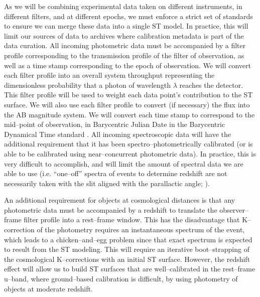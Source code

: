 As we will be combining experimental data taken on different instruments, in
different filters, and at different epochs, we must enforce a strict set of
standards to ensure we can merge these data into a single ST model. In practice,
this will limit our sources of data to archives where calibration metadata is
part of the data curation. All incoming photometric data must be accompanied by
a filter profile corresponding to the transmission profile of the filter of
observation, as well as a time stamp corresponding to the epoch of observation.
We will convert each filter profile into an overall system throughput
representing the dimensionless probability that a photon of wavelength $\lambda$
reaches the detector.  This filter profile will be used to weight each data
point's contribution to the ST surface.  We will also use each filter profile to
convert (if necessary) the flux into the AB magnitude system. We will convert
each  time stamp to correspond to the mid--point of observation, in Barycentric
Julian Date in the Barycentric Dynamical Time standard
\citep{2010PASP..122..935E}. All incoming spectroscopic data will have the
additional requirement that it has been spectro--photometrically calibrated (or
is able to be calibrated using near--concurrent photometric data).  In practice,
this is very difficult to accomplish, and will limit the amount of spectral data
we are able to use (i.e. ``one--off'' spectra of events to determine redshift
are not necessarily taken with the slit aligned with the parallactic angle;
\citealt{1982PASP...94..715F}).

An additional requirement for objects at cosmological distances is that any
photometric data must be accompanied by a redshift to translate the
observer--frame filter profile into a rest--frame window. This has the
disadvantage that K--correction of the photometry \citep{2002astro.ph.10394H}
requires an instantaneous spectrum of the event, which leads to a
chicken--and--egg problem since that exact spectrum is expected to result from
the ST modeling.  This will require an iterative boot--strapping of the
cosmological K--corrections with an initial ST surface.  However, the redshift
effect will allow us to build ST surfaces that are well--calibrated in the
rest--frame u--band, where ground--based calibration is difficult, by using
photometry of objects at moderate redshift.

\smallskip

